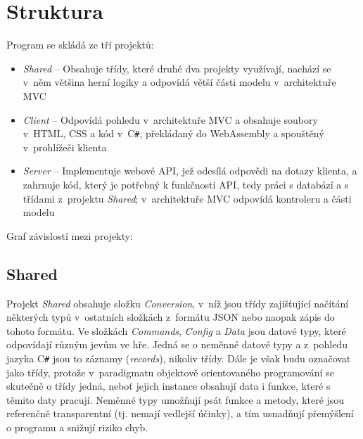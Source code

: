 \documentclass[a4paper,12pt]{article}
\def\CS{C\texttt{\#}}
\begin{document}
\section{Struktura}
Program se skládá ze tří projektů:
\begin{itemize}
\item\textit{Shared} -- Obsahuje třídy, které druhé dva projekty využívají, nachází se v~něm většina herní logiky a odpovídá větší části modelu v~architektuře MVC\cite{mvc}
\item\textit{Client} -- Odpovídá pohledu v~architektuře MVC a obsahuje soubory v~HTML, CSS a kód v~\CS{}, překládaný do WebAssembly a spouštěný v~prohlížeči klienta
\item\textit{Server} -- Implementuje webové API, jež odesílá odpovědi na dotazy klienta, a zahrnuje kód, který je potřebný k funkčnosti API, tedy práci s databází a s třídami z~projektu \textit{Shared}; v~architektuře MVC odpovídá kontroleru a části modelu
\end{itemize}

Graf závislostí mezi projekty:


\subsection{Shared}
Projekt \textit{Shared} obsahuje složku \textit{Conversion}, v~níž jsou třídy zajišťující načítání některých typů v~ostatních složkách z~formátu JSON nebo naopak zápis do tohoto formátu. Ve složkách \textit{Commands}, \textit{Config} a \textit{Data} jsou datové typy, které odpovídají různým jevům ve hře. Jedná se o neměnné datové typy a z~pohledu jazyka \CS{} jsou to záznamy (\textit{records}), nikoliv třídy. Dále je však budu označovat jako třídy, protože v~paradigmatu objektově orientovaného programování se skutečně o třídy jedná, neboť jejich instance obsahují data i funkce, které s těmito daty pracují.\cite{oop} Neměnné typy umožňují psát funkce a metody, které jsou referenčně transparentní (tj. nemají vedlejší účinky), a tím usnadňují přemýšlení o programu a snižují riziko chyb. \cite{immutable1}\cite{immutable2}
\end{document}
